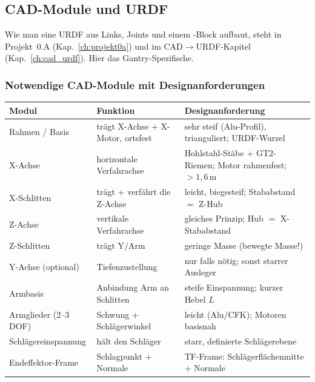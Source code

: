 \subsection{CAD-Module und URDF}
Wie man eine URDF aus Links, Joints und einem -Block aufbaut,
steht in Projekt~0.A (Kap.~\ref{ch:projekt0a}) und im CAD$\to$URDF-Kapitel
(Kap.~\ref{ch:cad_urdf}). Hier das Gantry-Spezifische.
\subsubsection{Notwendige CAD-Module mit Designanforderungen}
\begin{longtable}{@{}p{3.0cm}p{4.4cm}p{7.2cm}@{}}
\toprule
\textbf{Modul} & \textbf{Funktion} & \textbf{Designanforderung} \\
\midrule
Rahmen / Basis         & trägt X-Achse + X-Motor, ortsfest & sehr steif (Alu-Profil), trianguliert; URDF-Wurzel \\
X-Achse                & horizontale Verfahrachse & Hohlstahl-Stäbe + GT2-Riemen; Motor rahmenfest; $>1{,}6\,$m \\
X-Schlitten            & trägt + verfährt die Z-Achse & leicht, biegesteif; Stababstand $=$ Z-Hub \\
Z-Achse                & vertikale Verfahrachse & gleiches Prinzip; Hub $=$ X-Stababstand \\
Z-Schlitten            & trägt Y/Arm & geringe Masse (bewegte Masse!) \\
Y-Achse (optional)     & Tiefenzustellung & nur falls nötig; sonst starrer Ausleger \\
Armbasis               & Anbindung Arm an Schlitten & steife Einspannung; kurzer Hebel $L$ \\
Armglieder (2--3 DOF)  & Schwung + Schlägerwinkel & leicht (Alu/CFK); Motoren basisnah \\
Schlägereinspannung    & hält den Schläger & starr, definierte Schlägerebene \\
Endeffektor-Frame      & Schlagpunkt + Normale & TF-Frame: Schlägerflächenmitte + Normale \\
\bottomrule
\end{longtable}
